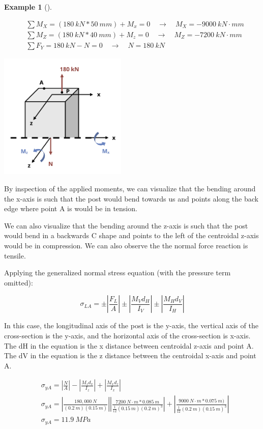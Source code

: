 \documentclass[
  letterpaper,
  DIV=11,
  numbers=noendperiod]{scrreprt}
\theoremstyle{definition}
\newtheorem{example}{Example}[chapter]
\theoremstyle{remark}
\begin{document}
\begin{tcolorbox}
\begin{example}[]
\begin{tcolorbox}
\[
\begin{aligned}
&\sum M_X=(180{~kN}*50{~mm})+M_x=0 \quad\rightarrow\quad M_X=-9000{~kN}\cdot{mm} \\
&\sum M_Z=(180{~kN}*40{~mm})+M_z=0 \quad\rightarrow\quad M_Z=-7200{~kN}\cdot{mm} \\
&\sum F_Y=180{~kN}-N=0 \quad\rightarrow\quad N=180{~kN}
\end{aligned}
\]

\begin{center}
\includegraphics[width=2.39583in,height=\textheight]{images/CH14 PNGs/example 14.3 part 2.png}
\end{center}

By inspection of the applied moments, we can visualize that the bending
around the x-axis is such that the post would bend towards us and points
along the back edge where point A is would be in tension.

We can also visualize that the bending around the z-axis is such that
the post would bend in a backwards C shape and points to the left of the
centroidal z-axis would be in compression. We can also observe the the
normal force reaction is tensile.

Applying the generalized normal stress equation (with the pressure term
omitted):

\[
\sigma_{L A}= \pm\left|\frac{F_L}{A}\right| \pm\left|\frac{M_V d_H}{I_V}\right| \pm\left|\frac{M_H d_V}{I_H}\right|
\]

In this case, the longitudinal axis of the post is the y-axis, the
vertical axis of the cross-section is the y-axis, and the horizontal
axis of the cross-section is x-axis. The dH in the equation is the x
distance between centroidal z-axis and point A. The dV in the equation
is the z distance between the centroidal x-axis and point A.

\[
\begin{aligned}
&\sigma_{yA}=\left|\frac{N}{A}\right|-\left|\frac{M_z d_x}{I_z}\right|+\left|\frac{M_x d_z}{I_x}\right| \\
&\sigma_{yA}=\left|\frac{180,000{~N}}{(0.2{~m})(0.15{~m})}\right| \left|\frac{7200{~N}\cdot{m}*0.085{~m}}{\frac{1}{12}(0.15{~m})(0.2 {~m})^3}\right|+\left| \frac{9000{~N}\cdot{m}*0.075{~m})}{\frac{1}{12}(0.2{~m})(0.15{~m})^3}\right| \\
&\sigma_{y A}=11.9{~MPa}
\end{aligned}
\]


\end{tcolorbox}
\end{example}
\end{tcolorbox}
\end{document}
